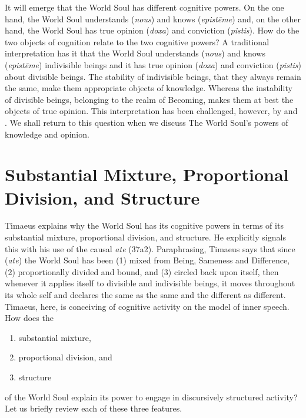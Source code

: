 It will emerge that the World Soul has different cognitive powers. On the one hand, the World Soul understands (\emph{nous}) and knows (\emph{epistēme}) and, on the other hand, the World Soul has true opinion (\emph{doxa}) and conviction (\emph{pistis}). How do the two objects of cognition relate to the two cognitive powers? A traditional interpretation has it that the World Soul understands (\emph{nous}) and knows (\emph{epistēme}) indivisible beings and it has true opinion (\emph{doxa}) and conviction (\emph{pistis}) about divisible beings. The stability of indivisible beings, that they always remain the same, make them appropriate objects of knowledge. Whereas the instability of divisible beings, belonging to the realm of Becoming, makes them at best the objects of true opinion. This interpretation has been challenged, however, by \citet{Frede:1996rb} and \citet{Corcilius:2018bd}. We shall return to this question when we discuss The World Soul's powers of knowledge and opinion.


\section{Substantial Mixture, Proportional Division, and Structure} %
\label{sec:the_substantial_mixture_proportional_division_and_structure_of_the_world_soul}

Timaeus explains why the World Soul has its cognitive powers in terms of its substantial mixture, proportional division, and structure. He explicitly signals this with his use of the causal \emph{ate} (37a2). Paraphrasing, Timaeus says that since (\emph{ate}) the World Soul has been (1) mixed from Being, Sameness and Difference, (2) proportionally divided and bound, and (3) circled back upon itself, then whenever it applies itself to divisible and indivisible beings, it moves throughout its whole self and declares the same as the same and the different as different. Timaeus, here, is conceiving of cognitive activity on the model of inner speech. How does the
\begin{enumerate}[(1)]
	\item substantial mixture,
	\item proportional division, and
	\item structure
\end{enumerate}
of the World Soul explain its power to engage in discursively structured activity? Let us briefly review each of these three features.


